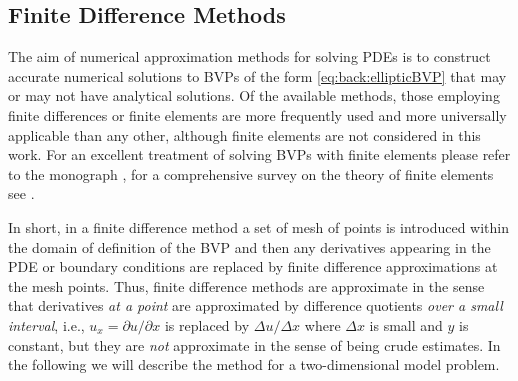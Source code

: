 \subsection{Finite Difference Methods}
\label{back:convdiff:findiff}

The aim of numerical approximation methods for solving PDEs is to construct
accurate numerical solutions to BVPs of the form \eqref{eq:back:ellipticBVP} that may or may not have analytical
solutions. Of the available methods, those employing finite differences or
finite elements are more frequently used and more universally applicable than
any other, although finite elements are not considered in this work. For an
excellent treatment of solving BVPs with finite elements please refer to the
monograph \cite{ElmSilWat14}, for a comprehensive survey on the theory of
finite elements see \cite{Bra07}.

In short, in a finite  difference method a set of mesh of points is introduced
within the domain of definition of the BVP and then any derivatives appearing
in the PDE or boundary conditions are replaced by finite difference
approximations at the mesh points. Thus, finite difference methods are
approximate in the sense that derivatives \emph{at a point} are approximated
by difference quotients \emph{over a small interval}, i.e., $u_x =\partial u/
\partial x$ is replaced by $\Delta u/\Delta x$ where $\Delta x$ is small and
$y$ is constant, but they are \emph{not} approximate in the sense of being
crude estimates. In the following we will  describe the method for a
two-dimensional model problem.

